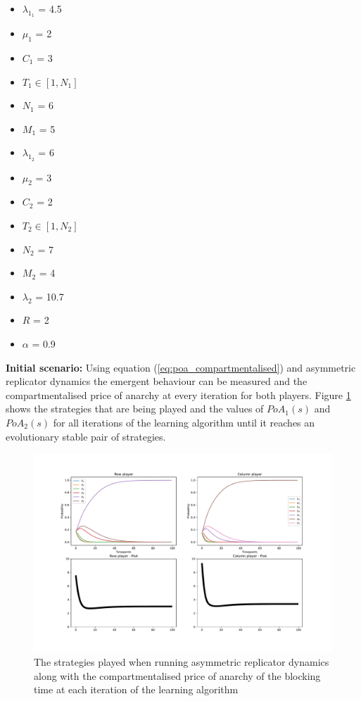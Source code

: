 \begin{multicols}{3}
    \begin{itemize}        
        \item \( \lambda_{1_1} \) = 4.5
        \item \( \mu_1 \) = 2
        \item \( C_1 \) = 3
        \item \( T_1 \in [1, N_1] \) 
        \item \( N_1 \) = 6
        \item \( M_1 \) = 5

        \columnbreak
        \item \( \lambda_{1_2} \) = 6
        \item \( \mu_2 \) = 3
        \item \( C_2 \) = 2
        \item \( T_2 \in [1, N_2] \)
        \item \( N_2 \) = 7
        \item \( M_2 \) = 4
        
        \columnbreak
        \item \( \lambda_2 \) = 10.7
        \item \( R \) = 2
        \item \( \alpha \) = 0.9
    \end{itemize}
\end{multicols}

\textbf{Initial scenario:}
Using equation (\ref{eq:poa_compartmentalised}) and asymmetric replicator 
dynamics the emergent behaviour can be measured and the compartmentalised price 
of anarchy at every iteration for both players.
Figure \ref{fig:ard_original} shows the strategies that are being played and 
the values of \(PoA_1(s)\) and \(PoA_2(s)\) for all iterations of the 
learning algorithm until it reaches an evolutionary stable pair of strategies.

\begin{figure}[H]
    \includegraphics[width=\textwidth]{imgs/asymmetric_rd_and_PoA/asymmetric_original.pdf}
    \caption{The strategies played when running asymmetric replicator dynamics
    along with the compartmentalised price of anarchy of the blocking time at
    each iteration of the learning algorithm}
    \label{fig:ard_original}
\end{figure}

